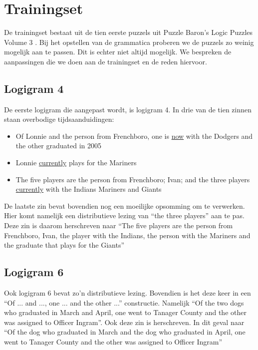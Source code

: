 \section{Trainingset}
De trainingset bestaat uit de tien eerste puzzels uit Puzzle Baron's Logic Puzzles Volume 3 \cite{logigrammen}. Bij het opstellen van de grammatica proberen we de puzzels zo weinig mogelijk aan te passen. Dit is echter niet altijd mogelijk. We bespreken de aanpassingen die we doen aan de trainingset en de reden hiervoor.

\subsection{Logigram 4}
De eerste logigram die aangepast wordt, is logigram 4. In drie van de tien zinnen staan overbodige tijdsaanduidingen:

\begin{itemize}
  \item Of Lonnie and the person from Frenchboro, one is \underline{now} with the Dodgers and the other graduated in 2005
  \item Lonnie \underline{currently} plays for the Mariners
  \item The five players are the person from Frenchboro; Ivan; and the three players \underline{currently} with the Indians Mariners and Giants
\end{itemize}

De laatste zin bevat bovendien nog een moeilijke opsomming om te verwerken. Hier komt namelijk een distributieve lezing van ``the three players'' aan te pas. Deze zin is daarom herschreven naar ``The five players are the person from Frenchboro, Ivan, the player with the Indians, the person with the Mariners and the graduate that plays for the Giants'' 

\subsection{Logigram 6}
Ook logigram 6 bevat zo'n distributieve lezing. Bovendien is het deze keer in een ``Of ... and ..., one ... and the other ...'' constructie. Namelijk ``Of the two dogs who graduated in March and April, one went to Tanager County and the other was assigned to Officer Ingram''. Ook deze zin is herschreven. In dit geval naar ``Of the dog who graduated in March and the dog who graduated in April, one went to Tanager County and the other was assigned to Officer Ingram''


